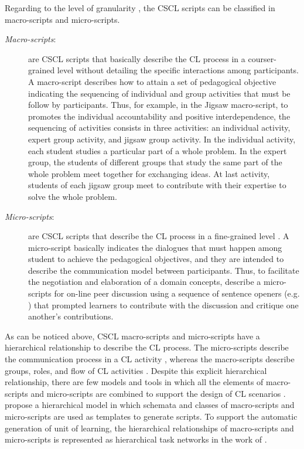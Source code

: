 Regarding to the level of granularity \cite{FischerKollarStegmannWeckerZottmann2013}, the CSCL scripts can be classified in macro-scripts and micro-scripts.

\begin{description}
\item[\emph{Macro-scripts}:] are CSCL scripts that basically describe the CL process in a courser-grained level without detailing the specific interactions among participants.
A macro-script describes how to attain a set of pedagogical objective indicating the sequencing of individual and group activities that must be follow by participants.
Thus, for example, in the Jigsaw macro-script, to promotes the individual accountability and positive interdependence, the sequencing of activities consists in three activities: an individual activity, expert group activity, and jigsaw group activity.
In the individual activity, each student studies a particular part of a whole problem.
In the expert group, the students of different groups that study the same part of the whole problem meet together for exchanging ideas.
At last activity, students of each jigsaw group meet to contribute with their expertise to solve the whole problem.

\item[\emph{Micro-scripts}:] are CSCL scripts that describe the CL process in a fine-grained level \cite{WeinbergerFischerStegmann2005}.
A micro-script basically indicates the dialogues that must happen among student to achieve the pedagogical objectives, and they are intended to describe the communication model between participants.
Thus, to facilitate the negotiation and elaboration of a domain concepts,  describe a micro-scripts for on-line peer discussion using a sequence of sentence openers (e.g. ) that prompted learners to contribute with the discussion and critique one another's contributions.
\end{description}

As can be noticed above, CSCL macro-scripts and micro-scripts have a hierarchical relationship to describe the CL process.
The micro-scripts describe the communication process in a CL activity \cite{WeinbergerFischerStegmann2005}, whereas the macro-scripts describe groups, roles, and flow of CL activities \cite{DillenbourgHong2008}.
Despite this explicit hierarchical relationship, there are few models and tools in which all the elements of macro-scripts and micro-scripts are combined to support the design of CL scenarios \cite{AlharbiAthaudaChiong2014, ChallcoBittencourtIsotani2016}.
 propose a hierarchical model in which schemata and classes of macro-scripts and micro-scripts are used as templates to generate scripts.
To support the automatic generation of unit of learning, the hierarchical relationships of macro-scripts and micro-scripts is represented as hierarchical task networks in the work of .

